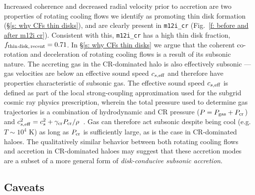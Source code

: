 \documentclass[fleqn,usenatbib]{mnras}
\newcommand{\fthin}{f_{\rm thin\,disk,\,recent}}
\begin{document}
Increased coherence and decreased radial velocity prior to accretion are two properties of rotating cooling flows we identify as promoting thin disk formation (\S\ref{s: why CFs thin disks}), and are clearly present in \texttt{m12i\_cr} (Fig.~\ref{f: before and after m12i cr}).
Consistent with this, \texttt{m12i\_cr} has a high thin disk fraction, $\fthin=0.71$.
In \S\ref{s: why CFs thin disks} we argue that the coherent co-rotation and deceleration of rotating cooling flows is a result of its subsonic nature.
The accreting gas in the CR-dominated halo is also effectively subsonic --- gas velocities are below an effective sound speed $c_{s,{\rm eff}}$ and therefore have properties characteristic of subsonic gas.
The effective sound speed $c_{s,{\rm eff}}$ is defined as part of the local strong-coupling approximation used for the subgrid cosmic ray physics prescription, wherein the total pressure used to determine gas trajectories is a combination of hydrodynamic and CR pressure ($P = P_{\rm gas} + P_{\rm cr}$) and $c^2_{s,{\rm eff}}=c^2_{s}+\gamma_{\rm cr} P_{\rm cr}/\rho$~\citep{Hopkins2020a}.
Gas can therefore act subsonic despite being cool (e.g. $T\sim10^4$ K) as long as $P_{\rm cr}$ is sufficiently large, as is the case in CR-dominated haloes.
The qualitatively similar behavior between both rotating cooling flows and accretion in CR-dominated haloes may suggest that these accretion modes are a subset of a more general form of \textit{disk-conducive subsonic accretion}.

\subsection{Caveats}
\label{s: caveats}
\end{document}
